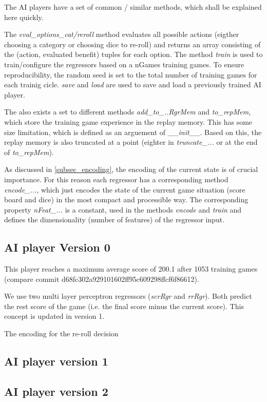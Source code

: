 \documentclass{article}
\begin{document}
The AI players have a set of common / similar methods, which shall be explained here quickly.

The \emph{eval\_options\_cat/reroll} method evaluates all possible actions
(eigther choosing a category or choosing dice to re-roll)
and returns an array consisting of the (action, evaluated benefit) tuples for each option.
The method \emph{train} is used to train/configure the regressors based on a nGames training games.
To ensure reproducibility, the random seed is set to the total number of training games for each trainig cicle.
\emph{save} and \emph{load} are used to save and load a previously trained AI player.

The also exists a set to different methods \emph{add\_to\_..RgrMem} and \emph{to\_repMem},
which store the training game experience in the replay memory.
This has some size limitation, which is defined as an arguement of \emph{\_\_init\_\_}.
Based on this, the replay memory is also truncated at a point
(eighter in \emph{truncate\_...} or at the end of \emph{to\_repMem}).

As discussed in \ref{subsec_encoding}, the encoding of the current state is of crucial importance.
For this reason each regressor has a corresponding method \emph{encode\_...},
which just encodes the state of the current game situation (score board and dice)
in the most compact and processible way.
The corresponding property \emph{nFeat\_...} is a constant, 
used in the methods \emph{encode} and \emph{train} and
defines the dimensionality (number of features) of the regressor input.

\subsection{AI player Version 0}
This player reaches a maximum average score of 200.1 after 1053 training games
(compare commit d68fc302a929101602ff95c609298ffcf6f86612).

We use two multi layer perceptron regressors (\emph{scrRgr} and \emph{rrRgr}).
Both predict the rest score of the game (i.e. the final score minus the current score).
This concept is updated in version 1.

The encoding for the re-roll decision


\subsection{AI player version 1}
\subsection{AI player version 2}
\end{document}
